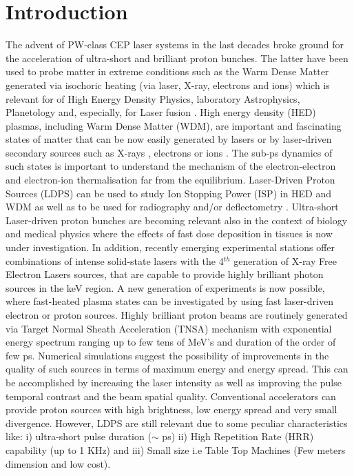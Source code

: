 \documentclass{cup-hpl}
\begin{document}
\section{Introduction}
The advent of PW-class CEP laser systems in the last decades broke ground for the acceleration of ultra-short and brilliant proton bunches. The latter have been used to probe matter in extreme conditions such as the Warm Dense Matter generated via isochoric heating (via laser, X-ray, electrons and ions) which is relevant for of High Energy Density Physics, laboratory Astrophysics, Planetology and, especially, for Laser fusion \cite{hur19, zyl22, mar18, rot01}. High energy density (HED)  plasmas, including Warm Dense Matter (WDM), are important and fascinating states of matter that can be now easily generated by lasers or by laser-driven secondary sources such as X-rays \cite{Zyl15}, electrons or ions \cite{patel2003}. The sub-ps dynamics of such states is important to understand the mechanism of the electron-electron and electron-ion thermalisation far from the equilibrium. Laser-Driven Proton Sources (LDPS) can be used to study Ion Stopping Power (ISP) in HED and WDM as well as to be used for radiography \cite{mac06,vol11} and/or deflectometry \cite{Li08}. Ultra-short Laser-driven proton bunches are becoming relevant also in the context of biology and medical physics where the effects of fast dose deposition in tissues is now under investigation. In addition, recently emerging experimental stations offer combinations of intense solid-state lasers with the 4$^{th}$ generation of X-ray Free Electron Lasers \cite{Zas21} sources, that are capable to provide highly brilliant photon sources in the keV region. A new generation of experiments is now possible, where fast-heated plasma states can be investigated by using fast laser-driven electron or proton sources. Highly brilliant proton beams are routinely generated via Target Normal Sheath Acceleration (TNSA) \cite{wilks2000} mechanism with exponential energy spectrum ranging up to few tens of MeV's and duration of the order of few ps. Numerical simulations suggest the possibility of improvements in the quality of such sources in terms of maximum energy and energy spread. This can be accomplished by increasing the laser intensity as well as improving the pulse temporal contrast and the beam spatial quality. Conventional accelerators can provide proton sources with high  brightness, low energy spread and very small divergence. However, LDPS are still relevant due to some peculiar characteristics like: i) ultra-short pulse duration ($\sim $  ps) ii) High Repetition Rate (HRR) capability (up to 1 KHz) and iii) Small size i.e Table Top Machines (Few meters dimension and low cost).
\end{document}
